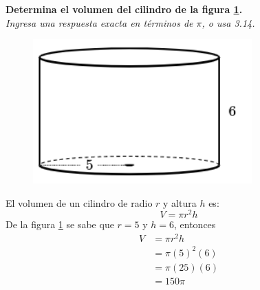 \textbf{Determina el volumen del cilindro de la figura \ref{fig:vol_cil_10}.}\\
\textit{Ingresa una respuesta exacta en términos de $\pi$, o usa 3.14.}\\

\begin{minipage}[t]{0.3\linewidth}
    \begin{figure}[H]
        \centering
        \includegraphics[width=0.75\textwidth]{../images/vol_cil_10.png}
        \caption{}
        \label{fig:vol_cil_10}
    \end{figure}
\end{minipage}%
\begin{minipage}[t]{0.7\linewidth}
    \begin{solutionbox}{5cm}        El volumen de un cilindro de radio $r$ y altura $h$ es:
        \begin{equation*}
            V = \pi r^2 h
        \end{equation*}
        De la figura \ref{fig:vol_cil_10} se sabe que $r=5$ y $h=6$, entonces
        \begin{equation*}
            \begin{split}
                V & = \pi r^2 h\\
                & = \pi (5)^2 (6)\\
                & = \pi (25) (6)\\
                & = 150\pi
            \end{split}
        \end{equation*}
    \end{solutionbox}
\end{minipage}%